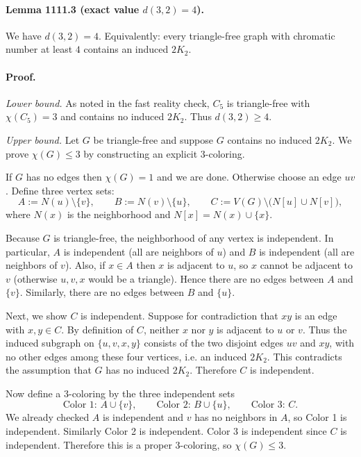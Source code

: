 \paragraph{Lemma 1111.3 (exact value $d(3,2)=4$).}
We have $d(3,2)=4$.
Equivalently: every triangle-free graph with chromatic number at least $4$ contains an induced $2K_2$.

\paragraph{Proof.}
\emph{Lower bound.}
As noted in the fast reality check, $C_5$ is triangle-free with $\chi(C_5)=3$ and contains no induced $2K_2$.
Thus $d(3,2)\ge 4$.

\emph{Upper bound.}
Let $G$ be triangle-free and suppose $G$ contains no induced $2K_2$.
We prove $\chi(G)\le 3$ by constructing an explicit 3-coloring.

If $G$ has no edges then $\chi(G)=1$ and we are done. Otherwise choose an edge $uv$.
Define three vertex sets:
\[A:=N(u)\setminus\{v\},\qquad B:=N(v)\setminus\{u\},\qquad C:=V(G)\setminus\bigl(N[u]\cup N[v]\bigr),\]
where $N(x)$ is the neighborhood and $N[x]=N(x)\cup\{x\}$.

Because $G$ is triangle-free, the neighborhood of any vertex is independent. In particular, $A$ is independent (all are neighbors of $u$) and $B$ is independent (all are neighbors of $v$).
Also, if $x\in A$ then $x$ is adjacent to $u$, so $x$ cannot be adjacent to $v$ (otherwise $u,v,x$ would be a triangle). Hence there are no edges between $A$ and $\{v\}$.
Similarly, there are no edges between $B$ and $\{u\}$.

Next, we show $C$ is independent. Suppose for contradiction that $xy$ is an edge with $x,y\in C$.
By definition of $C$, neither $x$ nor $y$ is adjacent to $u$ or $v$.
Thus the induced subgraph on $\{u,v,x,y\}$ consists of the two disjoint edges $uv$ and $xy$, with no other edges among these four vertices, i.e. an induced $2K_2$.
This contradicts the assumption that $G$ has no induced $2K_2$. Therefore $C$ is independent.

Now define a 3-coloring by the three independent sets
\[\text{Color 1: } A\cup\{v\},\qquad \text{Color 2: } B\cup\{u\},\qquad \text{Color 3: } C.
\]
We already checked $A$ is independent and $v$ has no neighbors in $A$, so Color 1 is independent.
Similarly Color 2 is independent.
Color 3 is independent since $C$ is independent.
Therefore this is a proper 3-coloring, so $\chi(G)\le 3$.

